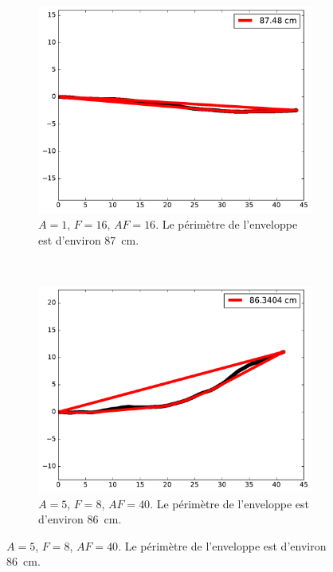 	
	\begin{figure}[htb]
		\centering
		\begin{subfigure}[t]{\subImgWarea}
			\centering
			\includegraphics[width=\textwidth]{figures/ch3/areaTraj_2_19_1_16}
			\caption{$A = 1$, $F=16$, $AF=16$. Le périmètre de l'enveloppe est d'environ 87~cm.}
			\label{fig:areaTraj_2_19_1_16}
		\end{subfigure}
		~
		\begin{subfigure}[t]{\subImgWarea}
			\centering
			\includegraphics[width=\textwidth]{figures/ch3/areaTraj_2_19_5_8}
			\caption{$A = 5$, $F=8$, $AF=40$. Le périmètre de l'enveloppe est d'environ 86~cm.}
			\label{fig:areaTraj_2_19_5_8}
		\end{subfigure}

\end{figure}
